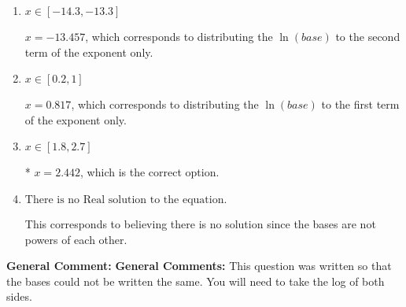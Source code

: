\documentclass{extbook}[14pt]
\begin{document}
\begin{enumerate}
{\begin{enumerate}[label=\Alph*.]
$x = -4.500$, which corresponds to solving the numerators as equal while ignoring the bases are different.
\item \( x \in [-14.3, -13.3] \)

$x = -13.457$, which corresponds to distributing the $\ln(base)$ to the second term of the exponent only.
\item \( x \in [0.2, 1] \)

$x = 0.817$, which corresponds to distributing the $\ln(base)$ to the first term of the exponent only.
\item \( x \in [1.8, 2.7] \)

* $x = 2.442$, which is the correct option.
\item \( \text{There is no Real solution to the equation.} \)

This corresponds to believing there is no solution since the bases are not powers of each other.
\end{enumerate}

\textbf{General Comment:} \textbf{General Comments:} This question was written so that the bases could not be written the same. You will need to take the log of both sides.
}
\end{enumerate}
\end{document}
